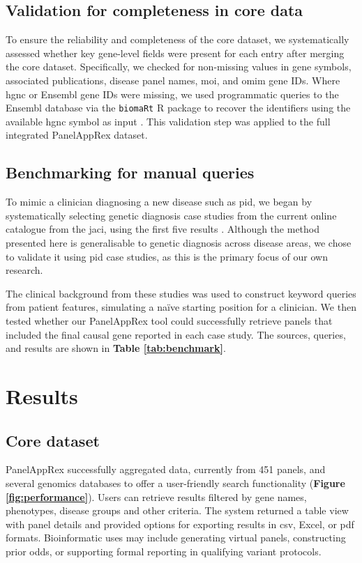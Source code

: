 \subsection{Validation for completeness in core data}
\noindent
To ensure the reliability and completeness of the core dataset, we systematically assessed whether key gene-level fields were present for each entry after merging the core dataset.
Specifically, we checked for non-missing values in gene symbols, associated publications, disease panel names, \ac{moi}, and \ac{omim} gene IDs. 
Where \ac{hgnc} or Ensembl gene IDs were missing, we used programmatic queries to the Ensembl database via the \texttt{biomaRt} R package to recover the identifiers using the available \ac{hgnc} symbol as input \cite{steffen_durinck_biomart}. 
This validation step was applied to the full integrated PanelAppRex dataset.

\subsection{Benchmarking for manual queries}
\noindent
To mimic a clinician diagnosing a new disease such as \ac{pid}, we began by systematically selecting genetic diagnosis case studies from the current online catalogue from the \ac{jaci}, using the first five results  \cite{arruda_genetic_2015, 
mcaleer_severe_2015,
verhoeven_hematopoietic_2022,
magerus-chatinet_autoimmune_2013,
sharfe_fatal_2014}. 
Although the method presented here is generalisable to genetic diagnosis across disease areas, we chose to validate it using \ac{pid} case studies, as this is the primary focus of our own research.

The clinical background from these studies was used to construct keyword queries from patient features, simulating a naïve starting position for a clinician.
We then tested whether our PanelAppRex tool could successfully retrieve panels that included the final causal gene reported in each case study. 
The sources, queries, and results are shown in \textbf{Table \ref{tab:benchmark}}. 

\section{Results}
\noindent
\subsection{Core dataset}
PanelAppRex successfully aggregated data, currently from 451 panels, and several genomics databases to offer a user-friendly search functionality (\textbf{Figure \ref{fig:performance}}).
Users can retrieve results filtered by gene names, phenotypes, disease groups and other criteria. 
The system returned a table view with panel details and provided options for exporting results in \ac{csv}, Excel, or \ac{pdf} formats.
Bioinformatic uses may include generating virtual panels, constructing prior odds, or supporting formal reporting in qualifying variant protocols.

